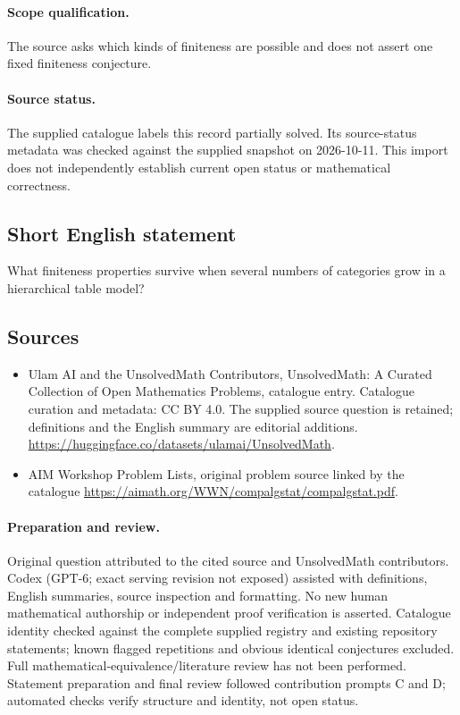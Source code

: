 \documentclass[11pt]{article}
\begin{document}
\paragraph{Scope qualification.}
The source asks which kinds of finiteness are possible and does not assert one fixed finiteness conjecture.
\paragraph{Source status.}
The supplied catalogue labels this record partially solved. Its source-status metadata was checked against the supplied snapshot on 2026-10-11. This import does not independently establish current open status or mathematical correctness.
\subsection{Short English statement}
What finiteness properties survive when several numbers of categories grow in a hierarchical table model?
\subsection{Sources}
\begin{itemize}
\item[S1] Ulam AI and the UnsolvedMath Contributors, UnsolvedMath: A Curated Collection of Open Mathematics Problems, catalogue entry. Catalogue curation and metadata: CC BY 4.0. The supplied source question is retained; definitions and the English summary are editorial additions.
\url{https://huggingface.co/datasets/ulamai/UnsolvedMath}.
\item[S2] AIM Workshop Problem Lists, original problem source linked by the catalogue
\url{https://aimath.org/WWN/compalgstat/compalgstat.pdf}.
\end{itemize}
\paragraph{Preparation and review.}
Original question attributed to the cited source and UnsolvedMath contributors. Codex (GPT-6; exact serving revision not exposed) assisted with definitions, English summaries, source inspection and formatting. No new human mathematical authorship or independent proof verification is asserted. Catalogue identity checked against the complete supplied registry and existing repository statements; known flagged repetitions and obvious identical conjectures excluded. Full mathematical-equivalence/literature review has not been performed. Statement preparation and final review followed contribution prompts C and D; automated checks verify structure and identity, not open status.
\label{end:statement}
\end{document}
